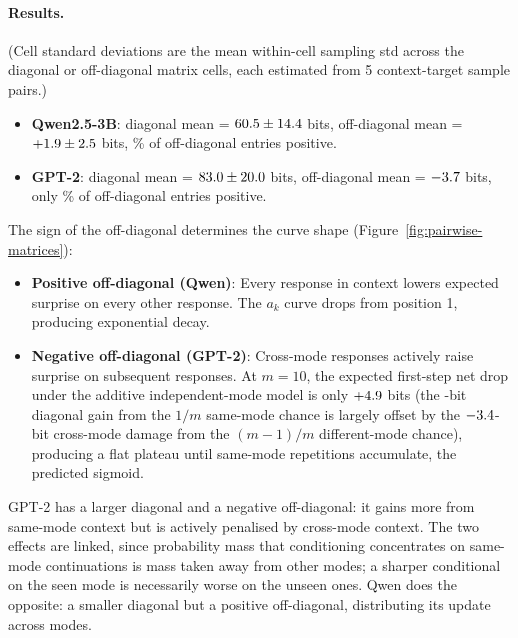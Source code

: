 \paragraph{Results.} (Cell standard deviations are the mean within-cell sampling std across the \crossmodeNumModes{} diagonal or \crossmodeNumOffPairs{} off-diagonal matrix cells, each estimated from 5 context-target sample pairs.)
\begin{itemize}[nosep]
    \item \textbf{Qwen2.5-3B}: diagonal mean = $60.5 \pm 14.4$ bits, off-diagonal mean = $+1.9 \pm 2.5$ bits, \crossmodeQwenOffPctPos\% of off-diagonal entries positive.
    \item \textbf{GPT-2}: diagonal mean = $83.0 \pm 20.0$ bits, off-diagonal mean = $-3.7$ bits, only \crossmodeGPTOffPctPos\% of off-diagonal entries positive.
\end{itemize}

The sign of the off-diagonal determines the curve shape (Figure~\ref{fig:pairwise-matrices}):
\begin{itemize}[nosep]
    \item \textbf{Positive off-diagonal (Qwen)}: Every response in context lowers expected surprise on every other response.
The $a_k$ curve drops from position 1, producing exponential decay.
    \item \textbf{Negative off-diagonal (GPT-2)}: Cross-mode responses actively raise surprise on subsequent responses.
At $m=10$, the expected first-step net drop under the additive independent-mode model is only $+4.9$ bits (the \crossmodeGPTDiagGainMten{}-bit diagonal gain from the $1/m$ same-mode chance is largely offset by the $-3.4$-bit cross-mode damage from the $(m{-}1)/m$ different-mode chance), producing a flat plateau until same-mode repetitions accumulate, the predicted sigmoid.
\end{itemize}

GPT-2 has a larger diagonal and a negative off-diagonal: it gains more from same-mode context but is actively penalised by cross-mode context.
The two effects are linked, since probability mass that conditioning concentrates on same-mode continuations is mass taken away from other modes; a sharper conditional on the seen mode is necessarily worse on the unseen ones.
Qwen does the opposite: a smaller diagonal but a positive off-diagonal, distributing its update across modes.

